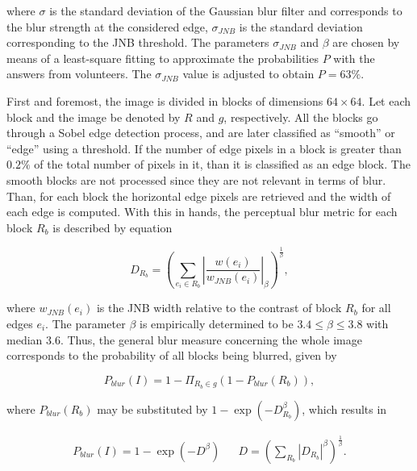 \noindent where $\sigma$ is the standard deviation of the Gaussian blur filter and corresponds to the blur strength at the considered edge, $\sigma_{JNB}$ is the standard deviation corresponding to the JNB threshold. The parameters $\sigma_{JNB}$ and $\beta$ are chosen by means of a least-square fitting to approximate the probabilities $P$ with the answers from volunteers. The $\sigma_{JNB}$ value is adjusted to obtain $P = 63\%$.

First and foremost, the image is divided in blocks of dimensions $64 \times 64$. Let each block and the image be denoted by $R$ and $g$, respectively. All the blocks go through a Sobel edge detection process, and are later classified as “smooth” or “edge” using a threshold. If the number of edge pixels in a block is greater than $0.2\%$ of the total number of pixels in it, than it is classified as an edge block. The smooth blocks are not processed since they are not relevant in terms of blur. Than, for each block the horizontal edge pixels are retrieved and the width of each edge is computed. With this in hands, the perceptual blur metric for each block $R_{b}$ is described by equation 

\begin{equation}
\label{eqn:perceptual_blur_metric}
D_{R_{b}} = \left(
\sum_{e_{i} \in R_{b}}
\left|
\frac{w(e_{i})}{w_{JNB}(e_{i})}
\right|_{\beta}
\right)^{\frac{1}{\beta}},
\end{equation}

\noindent where $w_{JNB}(e_{i})$ is the JNB width relative to the contrast of block $R_{b}$ for all edges $e_{i}$. The parameter $\beta$ is empirically determined to be $3.4 \leq \beta \leq 3.8$ with median $3.6$. Thus, the general blur measure concerning the whole image corresponds to the probability of all blocks being blurred, given by

\begin{equation}
\label{eqn:p_blur}
    P_{blur}(I) = 1 - \Pi_{R_{b} \in g}
    \left(
    1 - P_{blur}(R_{b})
    \right),
\end{equation}

\noindent where $P_{blur}(R_{b})$ may be substituted by $1 - \exp{\left(-D_{R_{b}}^{\beta} \right)}$, which results in

\begin{align}
\label{eqn:p_blur_final}
    P_{blur}(I) = 1 - \exp{\left(-D^{\beta}\right)}
&&
D = \left(
    \sum_{R_{b}}
    \left|D_{R_{b}}
    \right|^{\beta}
    \right)^{\frac{1}{\beta}}.
\end{align}


